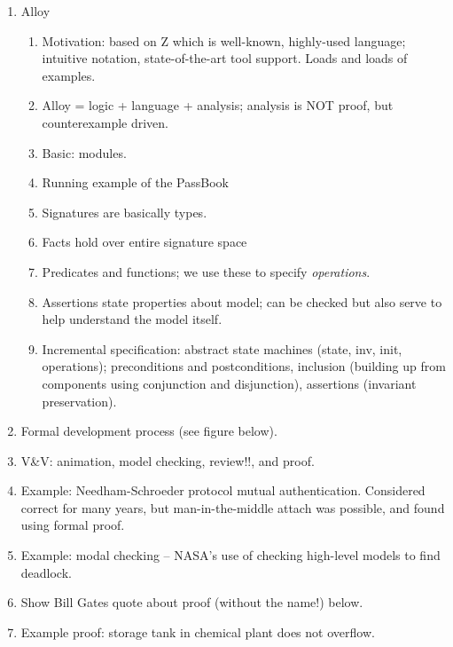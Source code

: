 \documentclass[11pt]{article}
\begin{document}
\begin{enumerate}
 \item Alloy

 \begin{enumerate}

  \item Motivation: based on Z which is well-known, highly-used language; intuitive notation, state-of-the-art tool support. Loads and loads of examples.

  \item Alloy = logic + language + analysis; analysis is NOT proof, but counterexample driven.

  \item Basic: modules. 

  \item Running example of the PassBook

  \item Signatures are basically types.

  \item Facts hold over entire signature space

  \item Predicates and functions; we use these to specify \emph{operations}.

  \item Assertions state properties about model; can be checked but also serve to help understand the model itself. 

 
  \item Incremental specification: abstract state machines (state, inv, init, operations); preconditions and postconditions, inclusion (building up from components using conjunction and disjunction), assertions (invariant preservation).

 \end{enumerate}

 \item Formal development process (see figure below).

 \item V\&V: animation, model checking, review!!, and proof.

 \item Example: Needham-Schroeder protocol mutual authentication. Considered correct for many years, but man-in-the-middle attach was possible, and found using formal proof.

 \item Example: modal checking -- NASA's use of checking high-level models to find deadlock.

 \item Show Bill Gates quote about proof (without the name!) below.

 \item Example proof: storage tank in chemical plant does not overflow.


\end{enumerate}
\end{document}
